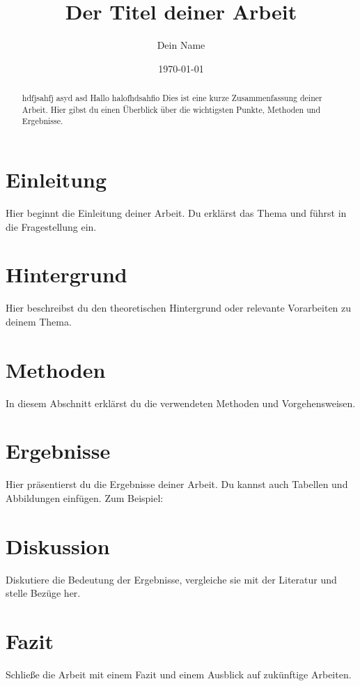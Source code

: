 \documentclass[a4paper,12pt]{article}
\title{Der Titel deiner Arbeit}
\author{Dein Name}
\date{\today} %
\begin{document}
\maketitle

\begin{abstract}
    hdfjsahfj asyd asd
    Hallo halofhdsahfio Dies ist eine kurze Zusammenfassung deiner Arbeit. Hier gibst du einen Überblick über die wichtigsten Punkte, Methoden und Ergebnisse.
\end{abstract}

\section{Einleitung}
Hier beginnt die Einleitung deiner Arbeit. Du erklärst das Thema und führst in die Fragestellung ein. 

\section{Hintergrund}
Hier beschreibst du den theoretischen Hintergrund oder relevante Vorarbeiten zu deinem Thema. 

\section{Methoden}
In diesem Abschnitt erklärst du die verwendeten Methoden und Vorgehensweisen.

\section{Ergebnisse}
Hier präsentierst du die Ergebnisse deiner Arbeit. Du kannst auch Tabellen und Abbildungen einfügen. Zum Beispiel:

\section{Diskussion}
Diskutiere die Bedeutung der Ergebnisse, vergleiche sie mit der Literatur und stelle Bezüge her.

\section{Fazit}
Schließe die Arbeit mit einem Fazit und einem Ausblick auf zukünftige Arbeiten.

\printbibliography
\end{document}
